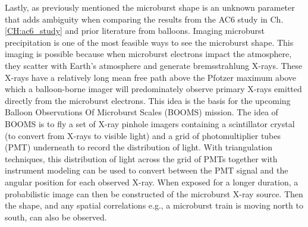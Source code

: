 Lastly, as previously mentioned the microburst shape is an unknown parameter that adds ambiguity when comparing the results from the AC6 study in Ch. \ref{CH:ac6_study} and prior literature from balloons. Imaging microburst precipitation is one of the most feasible ways to see the microburst shape. This imaging is possible because when microburst electrons impact the atmosphere, they scatter with Earth's atmosphere and generate bremsstrahlung X-rays. These X-rays have a relatively long mean free path above the Pfotzer maximum above which a balloon-borne imager will predominately observe primary X-rays emitted directly from the microburst electrons. This idea is the basis for the upcoming Balloon Observations Of Microburst Scales (BOOMS) mission. The idea of BOOMS is to fly a set of X-ray pinhole imagers containing a scintillator crystal (to convert from X-rays to visible light) and a grid of photomultiplier tubes (PMT) underneath to record the distribution of light. With triangulation techniques, this distribution of light across the grid of PMTs together with instrument modeling can be used to convert between the PMT signal and the angular position for each observed X-ray. When exposed for a longer duration, a probabilistic image can then be constructed of the microburst X-ray source. Then the shape, and any spatial correlations e.g., a microburst train is moving north to south, can also be observed.

